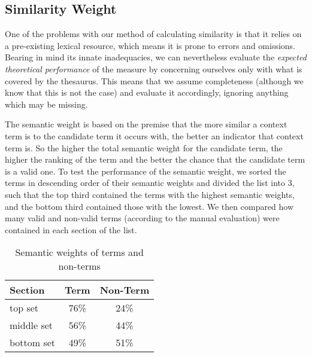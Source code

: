\subsection{Similarity Weight}

One of the problems with our method of calculating similarity is that
it relies on a pre-existing lexical resource, which means it is prone to errors
and omissions. Bearing in mind its innate inadequacies, we can
nevertheless evaluate the {\it expected theoretical performance} of
the measure by concerning ourselves only with what is covered by the
thesaurus. This means that we assume completeness (although we know
that this is not the case) and evaluate it accordingly, ignoring anything
which may be missing. 

The semantic weight is based on the premise that the more similar a
context term is to the candidate term it occurs with, the better an
indicator that context term is. So the higher the total semantic
weight for the candidate term, the higher the ranking of the term and
the better the chance that the candidate term is a valid one. To test
the performance of the semantic weight, we sorted the terms in
descending order of their semantic weights and divided the list into
3, such that the top third contained the terms with the highest
semantic weights, and the bottom third contained those with the
lowest. We then compared how many valid and non-valid terms
(according to the manual evaluation) were contained in each section
of the list.

\begin{table}
\begin{center}
\begin{tabular}{|l|c|c|}
\hline
Section & Term & Non-Term\\
\hline
top set & 76\% & 24\%\\
middle set & 56\% & 44\%\\
bottom set & 49\% & 51\%\\
\hline
\end{tabular}
\end{center}
\caption{Semantic weights of terms and non-terms}
\label{table:sem-eval}             
\end{table}

